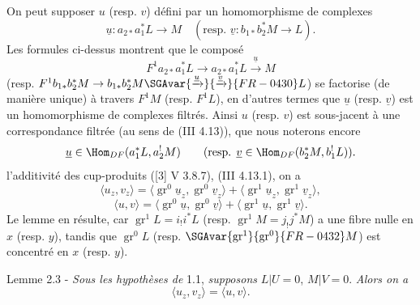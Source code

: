 On peut supposer $u$ (resp. $v$) défini par un homomorphisme de complexes
\[
\underline{u}:a_{2*}a_1^*L\longrightarrow M
\quad
(\text{resp. }\underline{v}:b_{1*}b_2^*M\longrightarrow L).
\]
Les formules ci-dessus montrent que le composé
\[
F^1a_{2*}a_1^*L\longrightarrow a_{2*}a_1^*L\xrightarrow{\underline{u}}M
\]
(resp. $F^1b_{1*}b_2^*M\to b_{1*}b_2^*M\SGAvar{\xrightarrow{\underline{u}}}{\xrightarrow{\underline{v}}}{FR-0430}L$) se factorise (de manière unique) à travers $F^1M$ (resp. $F^1L$), en d'autres termes que $\underline{u}$ (resp. $\underline{v}$) est un homomorphisme de complexes filtrés. Ainsi $u$ (resp. $v$) est sous-jacent à une correspondance filtrée (au sens de (III 4.13)), que nous noterons encore
\[
\underline{u}\in\Hom_{DF}(a_1^*L,a_2^!M)\qquad
(\text{resp. }\underline{v}\in\Hom_{DF}(b_2^*M,b_1^!L)).
\]
 l'additivité des cup-produits ([3] V 3.8.7), (III 4.13.1), on a
\[
\langle u_z,v_z\rangle
 =\langle \operatorname{gr}^0\underline{u}_z,\operatorname{gr}^0\underline{v}_z\rangle
 +\langle \operatorname{gr}^1\underline{u}_z,\operatorname{gr}^1\underline{v}_z\rangle,
\]
\[
\langle u,v\rangle
 =\langle \operatorname{gr}^0\underline{u},\operatorname{gr}^0\underline{v}\rangle
 +\langle \operatorname{gr}^1\underline{u},\operatorname{gr}^1\underline{v}\rangle.
\]
Le lemme en résulte, car $\operatorname{gr}^1L=i_!i^*L$ (resp. $\operatorname{gr}^1M=j_!j^*M$) a une fibre nulle en $x$ (resp. $y$), tandis que $\operatorname{gr}^0L$ (resp. $\SGAvar{\operatorname{gr}^1}{\operatorname{gr}^0}{FR-0432}M$) est concentré en $x$ (resp. $y$).

\begin{statement}{Lemme 2.3 -}
\emph{Sous les hypothèses de} 1.1, \emph{supposons} $L|U=0$, $M|V=0$. \emph{Alors on a}
\[
\langle u_z,v_z\rangle=\langle u,v\rangle .
\]
\end{statement}

